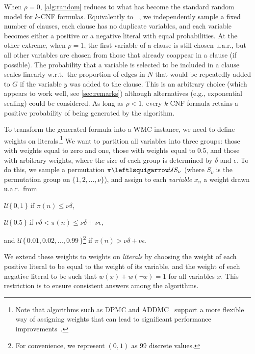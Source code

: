 \documentclass[letterpaper]{article} %
\theoremstyle{definition}
\theoremstyle{remark}
\begin{document}
When $\rho=0$, \cref{alg:random} reduces to what has become the standard random
model for $k$-CNF formulas. Equivalently to
\citeauthor{DBLP:journals/dam/FrancoP83}~,
we independently sample a fixed number of clauses, each clause has no duplicate
variables, and each variable becomes either a positive or a negative literal
with equal probabilities. At the other extreme, when $\rho = 1$, the first
variable of a clause is still chosen u.a.r., but all other variables are chosen
from those that already coappear in a clause (if possible). The probability that
a variable is selected to be included in a clause scales linearly w.r.t.\ the
proportion of edges in $N$ that would be repeatedly added to $G$ if the variable
$y$ was added to the clause. This is an arbitrary choice (which appears to work
well, see \cref{sec:remarks}) although alternatives (e.g., exponential scaling)
could be considered. As long as $\rho < 1$, every $k$-CNF formula retains a
positive probability of being generated by the algorithm.

To transform the generated formula into a \textsf{WMC} instance, we need
to define weights on literals.\footnote{Note that algorithms such as
  \textsc{DPMC} and
  \textsc{ADDMC}~\cite{DBLP:conf/aaai/DudekPV20,DBLP:conf/cp/DudekPV20} support
  a more flexible way of assigning weights that can lead to significant
  performance improvements~\cite{my_uai_paper,DBLP:conf/sat/DilkasB21}.} We want
to partition all variables into three groups: those with weights equal to zero
and one, those with weights equal to 0.5, and those with arbitrary weights,
where the size of each group is determined by $\delta$ and $\epsilon$. To do
this, we sample a permutation $\pi \leftlsquigarrow \mathcal{U}S_\nu$ (where
$S_\nu$ is the permutation group on $\{1, 2, \dots, \nu \}$), and assign to each
\emph{variable} $x_n$ a weight drawn u.a.r.\ from
\begin{itemize*}
\item $\mathcal{U}\{\,0, 1\,\}$ if $\pi(n) \le \nu\delta$,
\item $\mathcal{U}\{\,0.5\,\}$ if $\nu\delta < \pi(n) \le \nu\delta +
  \nu\epsilon$,
\item and $\mathcal{U}\{\, 0.01, 0.02, \dots, 0.99 \,\}$\footnote{For
    convenience, we represent $(0, 1)$ as 99 discrete values.} if $\pi(n) >
  \nu\delta + \nu\epsilon$.
\end{itemize*}
We extend these weights to weights on \emph{literals} by choosing the weight of
each positive literal to be equal to the weight of its variable, and the weight
of each negative literal to be such that $w(x) + w(\neg x) = 1$ for all
variables $x$. This restriction is to ensure consistent answers among the
algorithms.
\end{document}
